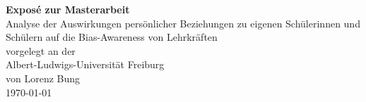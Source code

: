 \thispagestyle{empty}
\Huge{\textbf{Expos\'e zur Masterarbeit}}
\vspace{1cm}\\
\huge{Analyse der Auswirkungen persönlicher Beziehungen zu eigenen Schülerinnen und Schülern auf die Bias-Awareness von Lehrkräften}
\vspace{2cm}\\
\Large{vorgelegt an der}\\
\Large{Albert-Ludwigs-Universität Freiburg}
\vspace{2cm}\\
\Large{von Lorenz Bung}
\vspace{10cm}\\
\today
\newpage
{}